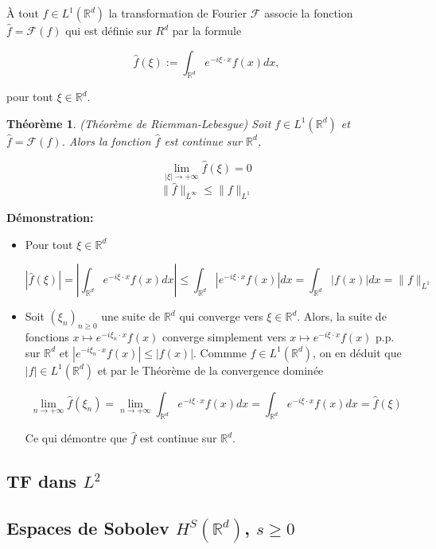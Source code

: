 \documentclass[10pt,a4paper,oneside]{article}
\newtheorem{theoreme}{Théorème}
\newenvironment{definition}[1][Definition]{\begin{trivlist}
\item[\hskip \labelsep {\bfseries #1}]}{\end{trivlist}}
\begin{document}
\begin{itemize}

\item
\begin{definition}
À tout $f \in L^1(\mathbb{R}^d)$ la transformation de Fourier $\mathcal{F}$ associe la fonction $\hat{f} = \mathcal{F}(f)$ qui est définie sur $R^d$ par la formule

\[ \hat{f}(\xi) := \int_{\mathbb{R}^d} e^{-i \xi \cdot x} f(x) dx, \]

pour tout $\xi \in \mathbb{R}^d$.
\end{definition}

\item
\begin{theoreme}
(Théorème de Riemman-Lebesgue)
Soit $f \in L^1(\mathbb{R}^d)$ et $\hat{f} = \mathcal{F}(f)$. Alors la fonction $\hat{f}$ est continue sur $\mathbb{R}^d$,

\[ \lim_{|\xi| \to +\infty} \hat{f}(\xi) = 0 \]
\[ \| \hat{f} \|_{L^\infty} \leq \| f \|_{L^1} \]
\end{theoreme}

\textbf{Démonstration:}

\begin{itemize}
\item
Pour tout $\xi \in \mathbb{R}^d$

\[ |\hat{f}(\xi)| = |\int_{\mathbb{R}^d} e^{-i \xi \cdot x} f(x) dx| \leq  \int_{\mathbb{R}^d} |e^{-i \xi \cdot x} f(x)| dx = \int_{\mathbb{R}^d} |f(x)|dx = \| f \|_{L^1} \]

\item
Soit $(\xi_n)_{n \geq 0}$ une suite de $\mathbb{R}^d$ qui converge vers $\xi \in \mathbb{R}^d$. Alors, la suite de fonctions $x \mapsto e^{-i \xi_n \cdot x}f(x)$ converge simplement vers $x \mapsto e^{-i \xi \cdot x} f(x)$ p.p. sur $\mathbb{R}^d$ et $|e^{-i \xi_n \cdot x} f(x)| \leq |f(x)|$. Commme $f \in L^1(\mathbb{R}^d)$, on en déduit que $|f| \in L^1(\mathbb{R}^d)$ et par le Théorème de la convergence dominée

\[ \lim_{n \to +\infty} \hat{f}(\xi_n) = \lim_{n \to +\infty} \int_{\mathbb{R}^d} e^{-i \xi \cdot x} f(x) dx = \int_{\mathbb{R}^d} e^{-i \xi \cdot x} f(x) dx = \hat{f}(\xi) \]

Ce qui démontre que $\hat{f}$ est continue sur $\mathbb{R}^d$.
\end{itemize}

\end{itemize}

\subsection{TF dans $L^2$}

\subsection{Espaces de Sobolev $H^S(\mathbb{R}^d)$, $s \geq 0$}
\end{document}
